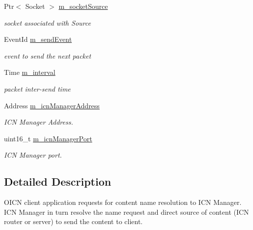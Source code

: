 \begin{DoxyCompactItemize}
Ptr$<$ Socket $>$ \hyperlink{classns3_1_1OicnClient_a7903a89bbce331174829f0f83b932ca0}{m\-\_\-socket\-Source}
\begin{DoxyCompactList}\small\item\em socket associated with Source \end{DoxyCompactList}\item 
Event\-Id \hyperlink{classns3_1_1OicnClient_ad4f77ec10de5d2aad0c3b42f56c22c8c}{m\-\_\-send\-Event}
\begin{DoxyCompactList}\small\item\em event to send the next packet \end{DoxyCompactList}\item 
Time \hyperlink{classns3_1_1OicnClient_a4b3472531c624271e4fa7a2deb1d524c}{m\-\_\-interval}
\begin{DoxyCompactList}\small\item\em packet inter-\/send time \end{DoxyCompactList}\item 
Address \hyperlink{classns3_1_1OicnClient_a52010a30a1032d875127a331b734f107}{m\-\_\-icn\-Manager\-Address}
\begin{DoxyCompactList}\small\item\em I\-C\-N Manager Address. \end{DoxyCompactList}\item 
uint16\-\_\-t \hyperlink{classns3_1_1OicnClient_abb0ac949b2aeea8fb892065a0372d0cc}{m\-\_\-icn\-Manager\-Port}
\begin{DoxyCompactList}\small\item\em I\-C\-N Manager port. \end{DoxyCompactList}\end{DoxyCompactItemize}


\subsection{Detailed Description}
O\-I\-C\-N client application requests for content name resolution to I\-C\-N Manager. I\-C\-N Manager in turn resolve the name request and direct source of content (I\-C\-N router or server) to send the content to client. 

